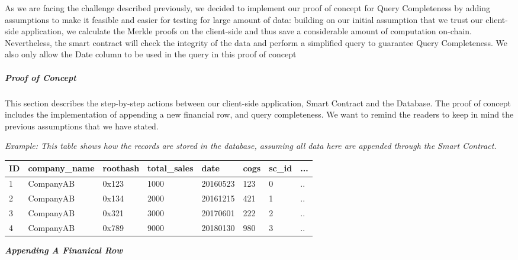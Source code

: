 As we are facing the challenge described previously, we decided to implement our proof of concept for Query Completeness by adding assumptions to make it feasible and easier for testing for large amount of data: building on our initial assumption that we trust our client-side application, we calculate the Merkle proofs on the client-side and thus save a considerable amount of computation on-chain. Nevertheless, the smart contract will check the integrity of the data and perform a simplified query to guarantee Query Completeness. We also only allow the Date column to be used in the query in this proof of concept

\subparagraph{Proof of Concept}

This section describes the step-by-step actions between our client-side application, Smart Contract and the Database. The proof of concept includes the implementation of appending a new financial row, and query completeness. We want to remind the readers to keep in mind the previous assumptions that we have stated.


\textit{Example: This table shows how the records are stored in the database, assuming all data here are appended through the Smart Contract.}
\begin{center}
    \begin{tabular}{| l | l | l | l | l | l | l | l |}
    \hline
    ID & company\_name & roothash & total\_sales & date & cogs & sc\_id & ... \\ \hline
    1 & CompanyAB & 0x123 & 1000 & 20160523 & 123 & 0 & .. \\ \hline
    2 & CompanyAB & 0x134 & 2000 & 20161215 & 421 & 1 & .. \\ \hline
    3 & CompanyAB & 0x321 & 3000 & 20170601 & 222 & 2 & .. \\ \hline
    4 & CompanyAB & 0x789 & 9000 & 20180130 & 980 & 3 & .. \\ \hline
    \end{tabular}
\end{center}



\textbf{\textit{Appending A Finanical Row}}

